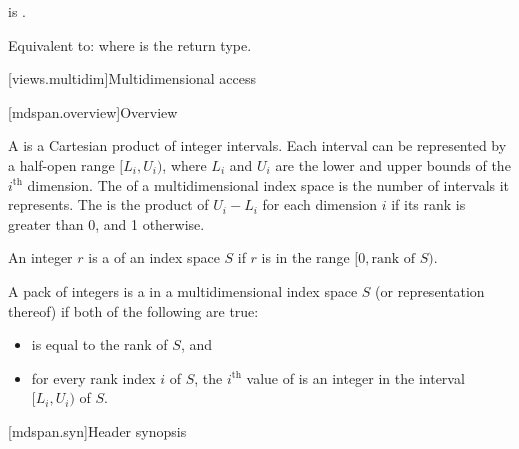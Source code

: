 \begin{itemdescr}
\pnum
\constraints
{} is .

\pnum
\effects
Equivalent to: 
where  is the return type.
\end{itemdescr}

[views.multidim]{Multidimensional access}

[mdspan.overview]{Overview}

\pnum
A  is
a Cartesian product of integer intervals.
Each interval can be represented by a half-open range $[L_i, U_i)$,
where $L_i$ and $U_i$ are the lower and upper bounds of
the $i^\text{th}$ dimension.
The  of a multidimensional index space is
the number of intervals it represents.
The  is
the product of $U_i - L_i$ for each dimension $i$
if its rank is greater than 0, and 1 otherwise.

\pnum
An integer $r$ is a  of an index space $S$
if $r$ is in the range $[0, \text{rank of $S$})$.

\pnum
A pack of integers  is
a  in a multidimensional index space $S$
(or representation thereof) if both of the following are true:
\begin{itemize}
\item
{} is equal to the rank of $S$, and
\item
for every rank index $i$ of $S$,
the $i^\text{th}$ value of  is an integer
in the interval $[L_i, U_i)$ of $S$.
\end{itemize}

[mdspan.syn]{Header  synopsis}

